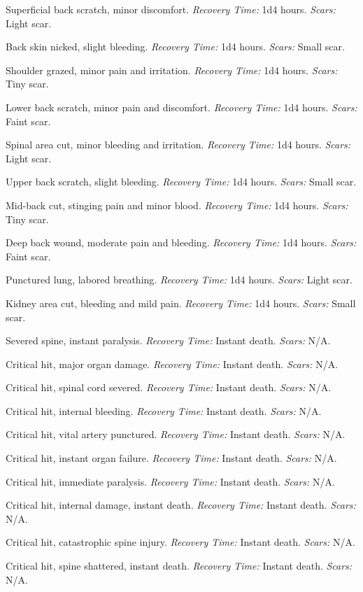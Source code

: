 \begin{description}[labelwidth=1.5em, leftmargin=*, itemsep=0.4em]
    \item[1 -] Superficial back scratch, minor discomfort. \textit{Recovery Time:} 1d4 hours. \textit{Scars:} Light scar.
    \item[2 -] Back skin nicked, slight bleeding. \textit{Recovery Time:} 1d4 hours. \textit{Scars:} Small scar.
    \item[3 -] Shoulder grazed, minor pain and irritation. \textit{Recovery Time:} 1d4 hours. \textit{Scars:} Tiny scar.
    \item[4 -] Lower back scratch, minor pain and discomfort. \textit{Recovery Time:} 1d4 hours. \textit{Scars:} Faint scar.
    \item[5 -] Spinal area cut, minor bleeding and irritation. \textit{Recovery Time:} 1d4 hours. \textit{Scars:} Light scar.
    \item[6 -] Upper back scratch, slight bleeding. \textit{Recovery Time:} 1d4 hours. \textit{Scars:} Small scar.
    \item[7 -] Mid-back cut, stinging pain and minor blood. \textit{Recovery Time:} 1d4 hours. \textit{Scars:} Tiny scar.
    \item[8 -] Deep back wound, moderate pain and bleeding. \textit{Recovery Time:} 1d4 hours. \textit{Scars:} Faint scar.
    \item[9 -] Punctured lung, labored breathing. \textit{Recovery Time:} 1d4 hours. \textit{Scars:} Light scar.
    \item[10 -] Kidney area cut, bleeding and mild pain. \textit{Recovery Time:} 1d4 hours. \textit{Scars:} Small scar.
    \item[11 -] Severed spine, instant paralysis. \textit{Recovery Time:} Instant death. \textit{Scars:} N/A.
    \item[12 -] Critical hit, major organ damage. \textit{Recovery Time:} Instant death. \textit{Scars:} N/A.
    \item[13 -] Critical hit, spinal cord severed. \textit{Recovery Time:} Instant death. \textit{Scars:} N/A.
    \item[14 -] Critical hit, internal bleeding. \textit{Recovery Time:} Instant death. \textit{Scars:} N/A.
    \item[15 -] Critical hit, vital artery punctured. \textit{Recovery Time:} Instant death. \textit{Scars:} N/A.
    \item[16 -] Critical hit, instant organ failure. \textit{Recovery Time:} Instant death. \textit{Scars:} N/A.
    \item[17 -] Critical hit, immediate paralysis. \textit{Recovery Time:} Instant death. \textit{Scars:} N/A.
    \item[18 -] Critical hit, internal damage, instant death. \textit{Recovery Time:} Instant death. \textit{Scars:} N/A.
    \item[19 -] Critical hit, catastrophic spine injury. \textit{Recovery Time:} Instant death. \textit{Scars:} N/A.
    \item[20 -] Critical hit, spine shattered, instant death. \textit{Recovery Time:} Instant death. \textit{Scars:} N/A.
\end{description}


